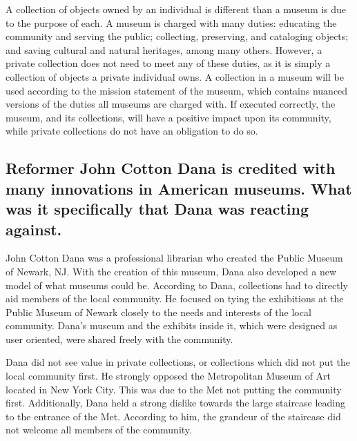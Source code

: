 \documentclass[11pt]{article}
\begin{document}
A collection of objects owned by an individual is different than a museum is due to the purpose of each. A museum is charged with many duties: educating the community and serving the public; collecting, preserving, and cataloging objects; and saving cultural and natural heritages, among many others. However, a private collection does not need to meet any of these duties, as it is simply a collection of objects a private individual owns. A collection in a museum will be used according to the mission statement of the museum, which contains nuanced versions of the duties all museums are charged with. If executed correctly, the museum, and its collections, will have a positive impact upon its community, while private collections do not have an obligation to do so.

\begin{singlespacing}
\subsection*{Reformer John Cotton Dana is credited with many innovations in American museums. What was it specifically that Dana was reacting against.}
\end{singlespacing}

John Cotton Dana was a professional librarian who created the Public Museum of Newark, NJ. With the creation of this museum, Dana also developed a new model of what museums could be. According to Dana, collections had to directly aid members of the local community. He focused on tying the exhibitions at the Public Museum of Newark closely to the needs and interests of the local community. Dana's museum and the exhibits inside it, which were designed as user oriented, were shared freely with the community.

Dana did not see value in private collections, or collections which did not put the local community first. He strongly opposed the Metropolitan Museum of Art located in New York City. This was due to the Met not putting the community first. Additionally, Dana held a strong dislike towards the large staircase leading to the entrance of the Met. According to him, the grandeur of the staircase did not welcome all members of the community.
\end{document}
